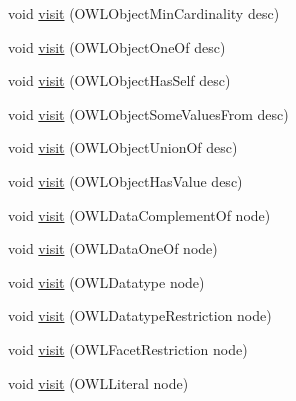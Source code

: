 \begin{DoxyCompactItemize}
\item 
void \hyperlink{classorg_1_1coode_1_1owlapi_1_1functionalrenderer_1_1_o_w_l_object_renderer_a67395bf439db6d60f830f9370139cccb}{visit} (O\-W\-L\-Object\-Min\-Cardinality desc)
\item 
void \hyperlink{classorg_1_1coode_1_1owlapi_1_1functionalrenderer_1_1_o_w_l_object_renderer_abae32a6f9992183c2b00a56c72503ebb}{visit} (O\-W\-L\-Object\-One\-Of desc)
\item 
void \hyperlink{classorg_1_1coode_1_1owlapi_1_1functionalrenderer_1_1_o_w_l_object_renderer_ab2f2f21fefdc1558b82194edd5d91577}{visit} (O\-W\-L\-Object\-Has\-Self desc)
\item 
void \hyperlink{classorg_1_1coode_1_1owlapi_1_1functionalrenderer_1_1_o_w_l_object_renderer_a3a2f556e96ec98ced5671b573eb0d9c3}{visit} (O\-W\-L\-Object\-Some\-Values\-From desc)
\item 
void \hyperlink{classorg_1_1coode_1_1owlapi_1_1functionalrenderer_1_1_o_w_l_object_renderer_ac6da0c40346b74e1d3590c511340cacb}{visit} (O\-W\-L\-Object\-Union\-Of desc)
\item 
void \hyperlink{classorg_1_1coode_1_1owlapi_1_1functionalrenderer_1_1_o_w_l_object_renderer_a016b4d6e49490fff26e378c52401174c}{visit} (O\-W\-L\-Object\-Has\-Value desc)
\item 
void \hyperlink{classorg_1_1coode_1_1owlapi_1_1functionalrenderer_1_1_o_w_l_object_renderer_ad41a4e310415ce462758342a98e1ffa6}{visit} (O\-W\-L\-Data\-Complement\-Of node)
\item 
void \hyperlink{classorg_1_1coode_1_1owlapi_1_1functionalrenderer_1_1_o_w_l_object_renderer_af8de6ee260b6601c587b07ba4fd8a338}{visit} (O\-W\-L\-Data\-One\-Of node)
\item 
void \hyperlink{classorg_1_1coode_1_1owlapi_1_1functionalrenderer_1_1_o_w_l_object_renderer_a485de16bc3a24496aa3c49a33cd54597}{visit} (O\-W\-L\-Datatype node)
\item 
void \hyperlink{classorg_1_1coode_1_1owlapi_1_1functionalrenderer_1_1_o_w_l_object_renderer_a33411156c35e91d54ec91568a496c009}{visit} (O\-W\-L\-Datatype\-Restriction node)
\item 
void \hyperlink{classorg_1_1coode_1_1owlapi_1_1functionalrenderer_1_1_o_w_l_object_renderer_aefa8612f15183330ec0cf4beda321348}{visit} (O\-W\-L\-Facet\-Restriction node)
\item 
void \hyperlink{classorg_1_1coode_1_1owlapi_1_1functionalrenderer_1_1_o_w_l_object_renderer_a2e205a49fb1e08d2eca5d37b4ec4891f}{visit} (O\-W\-L\-Literal node)
\item 

\end{DoxyCompactItemize}

